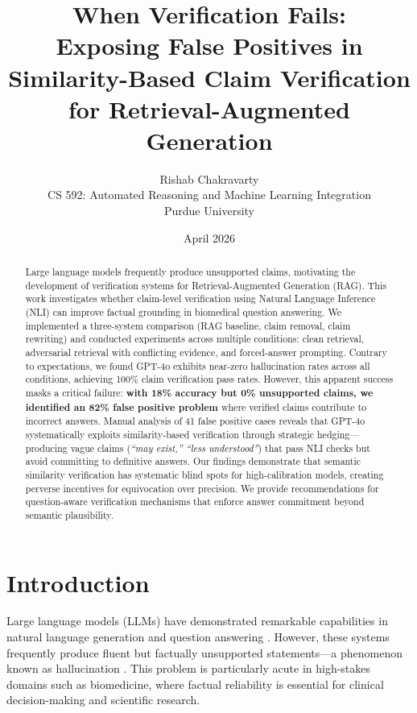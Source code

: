 \documentclass[11pt]{article}
\title{\textbf{When Verification Fails: \\
Exposing False Positives in Similarity-Based Claim Verification for Retrieval-Augmented Generation}}
\author{Rishab Chakravarty\\
CS 592: Automated Reasoning and Machine Learning Integration\\
Purdue University}
\date{April 2026}
\begin{document}
\maketitle

\vspace{-1em}

\begin{abstract}
Large language models frequently produce unsupported claims, motivating the development of verification systems for Retrieval-Augmented Generation (RAG). This work investigates whether claim-level verification using Natural Language Inference (NLI) can improve factual grounding in biomedical question answering. We implemented a three-system comparison (RAG baseline, claim removal, claim rewriting) and conducted experiments across multiple conditions: clean retrieval, adversarial retrieval with conflicting evidence, and forced-answer prompting. Contrary to expectations, we found GPT-4o exhibits near-zero hallucination rates across all conditions, achieving 100\% claim verification pass rates. However, this apparent success masks a critical failure: \textbf{with 18\% accuracy but 0\% unsupported claims, we identified an 82\% false positive problem} where verified claims contribute to incorrect answers. Manual analysis of 41 false positive cases reveals that GPT-4o systematically exploits similarity-based verification through strategic hedging—producing vague claims (\textit{``may exist,'' ``less understood''}) that pass NLI checks but avoid committing to definitive answers. Our findings demonstrate that semantic similarity verification has systematic blind spots for high-calibration models, creating perverse incentives for equivocation over precision. We provide recommendations for question-aware verification mechanisms that enforce answer commitment beyond semantic plausibility.
\end{abstract}

\section{Introduction}

Large language models (LLMs) have demonstrated remarkable capabilities in natural language generation and question answering \cite{brown2020language}. However, these systems frequently produce fluent but factually unsupported statements—a phenomenon known as hallucination \cite{ji2023survey}. This problem is particularly acute in high-stakes domains such as biomedicine, where factual reliability is essential for clinical decision-making and scientific research.
\end{document}
